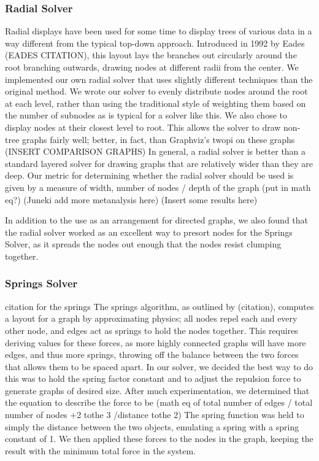 \documentclass{article}
\begin{document}
\subsubsection{Radial Solver}
Radial displays have been used for some time to display trees of various data in a way different from the typical top-down approach.
Introduced in 1992 by Eades (EADES CITATION), this layout lays the branches out circularly around the root branching outwards, drawing 
nodes at different radii from the center. We implemented our own radial solver that uses slightly different techniques than the original
method. We wrote our solver to evenly distribute nodes around the root at each level, rather than using the traditional style of weighting 
them based on the number of subnodes as is typical for a solver like this. We also chose to display nodes at their closest level to root. 
This allows the solver to draw non-tree graphs fairly well; better, in fact, than Graphviz's twopi on these graphs (INSERT COMPARISON GRAPHS) 
In general, a radial solver is better than a standard layered solver for drawing graphs that are relatively wider than they are deep. Our metric 
for determining whether the radial solver should be used is given by a measure of width, number of nodes / depth of the graph (put in math eq?) (Juneki
add more metanalysis here) (Insert some results here)

In addition to the use as an arrangement for directed graphs, we also found that the radial solver worked as an excellent way to presort nodes for the
Springs Solver, as it spreads the nodes out enough that the nodes resist clumping together.

\subsubsection{Springs Solver}
citation for the springs\cite{springs}
The springs algorithm, as outlined by (citation), computes a layout for a graph by approximating physics; all nodes repel each and every other node, 
and edges act as springs to hold the nodes together. This requires deriving values for these forces, as more highly connected graphs will have 
more edges, and thus more springs, throwing off the balance between the two forces that allows them to be spaced apart. In our solver, we decided
the best way to do this was to hold the spring factor constant and to adjust the repulsion force to generate graphs of desired size. After much 
experimentation, we determined that the equation to describe the force to be (math eq of total number of edges / total number of nodes +2 tothe 3 /distance tothe 2)
The spring function was held to simply the distance between the two objects, emulating a spring with a spring constant of 1. We then applied these forces
to the nodes in the graph, keeping the result with the minimum total force in the system.
\end{document}
